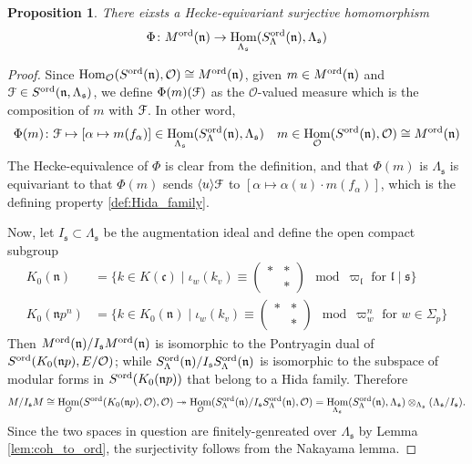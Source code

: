 \documentclass[leqno]{amsart}
\newtheorem{prop}[thm]{Proposition}
\theoremstyle{definition}
\theoremstyle{remark}
\newcommand{\oo}{\mathcal{O}}
\DeclareMathOperator{\Hom}{Hom}
\newcommand{\fc}{\mathfrak{c}}
\newcommand{\fs}{\mathfrak{s}}
\newcommand{\fn}{\mathfrak{n}}
\newcommand{\fl}{\mathfrak{l}}
\newcommand{\euF}{\EuScript{F}} %
\newcommand{\ord}{\textnormal{ord}} %
\begin{document}
\begin{prop}\label{prop:ord_to_dual}
	There eixsts a Hecke-equivariant surjective 
	homomorphism 
	\[
		\Phi\colon M^{\ord}(\fn)\to 
		\Hom_{\Lambda_{\fs}}
		(S_\Lambda^{\ord}(\fn),\Lambda_{\fs})
	\]
\end{prop}
\begin{proof}
Since $\Hom_\oo(S^{\ord}(\fn),\oo)\cong M^{\ord}(\fn)$,
given $m\in M^{\ord}(\fn)$ and
$\euF\in S^{\ord}(\fn,\Lambda_{\fs})$,
we define $\Phi(m)(\euF)$ as the 
$\oo$-valued measure which is the composition
of $m$ with  $\euF$.
In other word, 
\begin{equation}
	\Phi(m)\colon \euF\mapsto
	[\alpha\mapsto m(f_\alpha)]
	\in \Hom_{\Lambda_{\fs}}
	(S_\Lambda^{\ord}(\fn),\Lambda_{\fs})\quad
	m\in \Hom_\oo(S^{\ord}(\fn),\oo)\cong M^{\ord}(\fn)
\end{equation}
The Hecke-equivalence of $\Phi$
is clear from the definition,
and that $\Phi(m)$ is $\Lambda_{\fs}$
is equivariant to that 
$\Phi(m)$ sends $\langle u\rangle \euF$
to $[\alpha\mapsto \alpha(u)\cdot m(f_\alpha)]$,
which is the defining property \eqref{def:Hida_family}.

Now, let $I_\fs\subset\Lambda_{\fs}$ be the augmentation ideal
and define the open compact subgroup
\begin{align*}
	K_0(\fn)&=
	\{
	k\in K(\fc)\mid
	\iota_{w}(k_v)\equiv
	(\begin{smallmatrix}
		*&*\\&*
	\end{smallmatrix})\mod \varpi_\fl
	\text{ for } \fl\mid \fs
	\}\\
	K_0(\fn p^n)&=
	\{
	k\in K_0(\fn)\mid
	\iota_{w}(k_v)\equiv
	(\begin{smallmatrix}
		*&*\\&*
	\end{smallmatrix})\mod \varpi_w^n
	\text{ for } w\in \Sigma_p
	\}
\end{align*}
Then $M^{\ord}(\fn)/I_\fs M^{\ord}(\fn)$
is isomorphic to the Pontryagin dual
of $S^{\ord}(K_0(\fn p),E/\oo)$;
while $S^{\ord}_\Lambda(\fn)/I_\fs S^{\ord}_\Lambda(\fn)$
is isomorphic to the subspace 
of modular forms in $S^{\ord}(K_0(\fn p))$ that belong
to a Hida family. Therefore
\[
	M/I_{\fs}M\cong \Hom_{\oo}(S^{\ord}(K_0(\fn p),\oo)
	,\oo) \twoheadrightarrow \Hom_{\oo} 
	(S_\Lambda^{\ord}(\fn)/I_\fs S_\Lambda^{\ord}(\fn)
	,\oo)
	=\Hom_{\Lambda_{\fs}} 
	(S_\Lambda^{\ord}(\fn),\Lambda_{\fs})
	\otimes_{\Lambda_{\fs}}(\Lambda_{\fs}/I_{\fs}).
\]
Since the two spaces in question
are finitely-genreated over $\Lambda_{\fs}$
by Lemma \ref{lem:coh_to_ord},
the surjectivity follows from the Nakayama lemma.
\end{proof}
\end{document}
